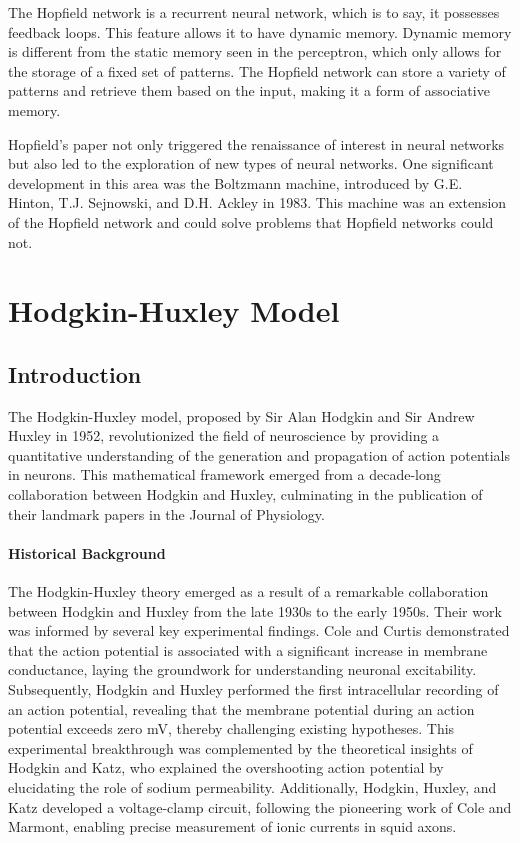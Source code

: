 \documentclass[12pt,a4paper]{report}
\begin{document}
The Hopfield network is a recurrent neural network, which is to say, it possesses feedback loops. This feature allows it to have dynamic memory. Dynamic memory is different from the static memory seen in the perceptron, which only allows for the storage of a fixed set of patterns. The Hopfield network can store a variety of patterns and retrieve them based on the input, making it a form of associative memory.

Hopfield's paper not only triggered the renaissance of interest in neural networks but also led to the exploration of new types of neural networks. One significant development in this area was the Boltzmann machine, introduced by G.E. Hinton, T.J. Sejnowski, and D.H. Ackley in 1983. This machine was an extension of the Hopfield network and could solve problems that Hopfield networks could not.


\chapter{Hodgkin-Huxley Model}

\section{Introduction}

The Hodgkin-Huxley model, proposed by Sir Alan Hodgkin and Sir Andrew Huxley in 1952, revolutionized the field of neuroscience by providing a quantitative understanding of the generation and propagation of action potentials in neurons. This mathematical framework emerged from a decade-long collaboration between Hodgkin and Huxley, culminating in the publication of their landmark papers in the Journal of Physiology.

\subsubsection{Historical Background}

The Hodgkin-Huxley theory emerged as a result of a remarkable collaboration between Hodgkin and Huxley from the late 1930s to the early 1950s. Their work was informed by several key experimental findings. Cole and Curtis demonstrated that the action potential is associated with a significant increase in membrane conductance, laying the groundwork for understanding neuronal excitability\cite{Cole1939}. Subsequently, Hodgkin and Huxley performed the first intracellular recording of an action potential, revealing that the membrane potential during an action potential exceeds zero mV, thereby challenging existing hypotheses\cite{Hodgkin1939}. This experimental breakthrough was complemented by the theoretical insights of Hodgkin and Katz, who explained the overshooting action potential by elucidating the role of sodium permeability\cite{Hodgkin1949}. Additionally, Hodgkin, Huxley, and Katz developed a voltage-clamp circuit, following the pioneering work of Cole and Marmont, enabling precise measurement of ionic currents in squid axons\cite{Hausser2000}.
\end{document}
